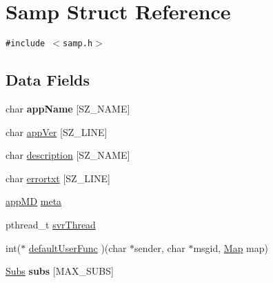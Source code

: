\hypertarget{structSamp}{
\section{Samp Struct Reference}
\label{structSamp}
}
{\tt \#include $<$samp.h$>$}

\subsection*{Data Fields}
\begin{CompactItemize}
\item 
\hypertarget{structSamp_f372ba3fd5ff2d8c8ec06bd33403ca9e}{
char \textbf{appName} \mbox{[}SZ\_\-NAME\mbox{]}}
\label{structSamp_f372ba3fd5ff2d8c8ec06bd33403ca9e}

\item 
char \hyperlink{structSamp_df7c497b6dbffc08e8ef5d7edd4ee97e}{appVer} \mbox{[}SZ\_\-LINE\mbox{]}
\item 
char \hyperlink{structSamp_d672d7d425e8180b93c7ca2229d1acd8}{description} \mbox{[}SZ\_\-NAME\mbox{]}
\item 
char \hyperlink{structSamp_62629ad2155a2a1a7676e32ef9fb9ffd}{errortxt} \mbox{[}SZ\_\-LINE\mbox{]}
\item 
\hyperlink{structappMD}{appMD} \hyperlink{structSamp_0884021074d1ed14342187005e0b78e7}{meta}
\item 
pthread\_\-t \hyperlink{structSamp_e7db0cac0c4ad61c9ed7f3d344b623cf}{svrThread}
\item 
int($\ast$ \hyperlink{structSamp_eb399d3fb381bee752b5747ff4cb9a9b}{defaultUserFunc} )(char $\ast$sender, char $\ast$msgid, \hyperlink{sampDecl_8h_39a90bc041db57e1a6ba736ba91eee30}{Map} map)
\item 
\hypertarget{structSamp_60d87008915bca91796cbdf77537e5f0}{
\hyperlink{structSubs}{Subs} \textbf{subs} \mbox{[}MAX\_\-SUBS\mbox{]}}
\label{structSamp_60d87008915bca91796cbdf77537e5f0}


\end{CompactItemize}
